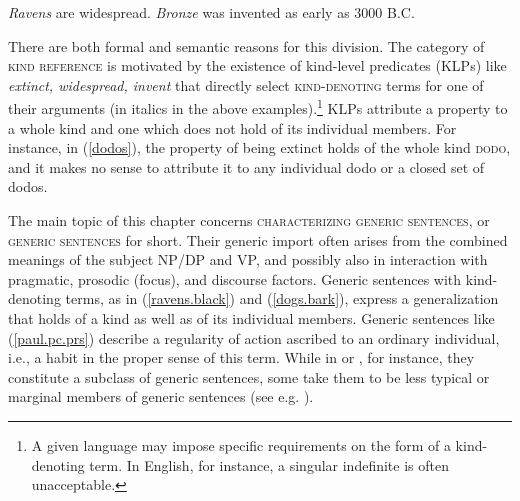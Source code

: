 \documentclass[output=paper,colorlinks,citecolor=brown]{langscibook}
\begin{document}
\ea
\ea \textit{Ravens} are widespread.      					
\ex \textit{Bronze} was invented as early as 3000 B.C.		
\z
\z

\ea
{}    
\z
\z

\noindent
There are both formal and semantic reasons for this
division. The category of \textsc{kind reference} is motivated by the existence of kind-level predicates (KLPs) like \textit{extinct, widespread, invent} that directly select \textsc{kind-denoting} terms for one of their arguments (in italics in the above examples).\footnote{A given language may impose 
specific requirements on the form of a kind-denoting term. In English, for instance, a singular indefinite is often unacceptable.} 
KLPs attribute a property to a whole kind and one which
does not hold of its individual members. For instance, in (\ref{dodos}), the property of being extinct holds of the whole kind \textsc{dodo}, and it makes no sense to attribute it to any individual dodo or a closed set of dodos.	
 
The main topic of this chapter concerns \textsc{characterizing generic sentences}, or 
\textsc{generic sentences} for short. 
Their generic import often arises from the combined meanings of the subject NP/DP and VP, and possibly also in interaction with pragmatic, pro\-s\-odic (focus), and discourse factors. Generic sentences with kind-denoting terms, as in (\ref{ravens.black}) and (\ref{dogs.bark}), express a generalization that holds of a kind 
as well as of its individual members. 
Generic sentences like (\ref{paul.pc.prs}) describe a regularity of action ascribed to an ordinary individual, i.e., a habit in the proper sense of this term. While in \citet{krifka1995genericity} or \citet{carlson2011}, for instance, they constitute a subclass of generic sentences, some take them to be less typical or marginal members of generic sentences (see e.g. \citealt{nickel2017}).

\end{document}
